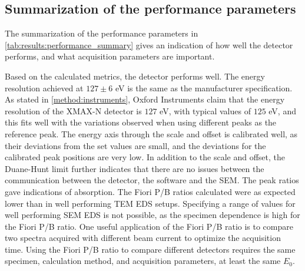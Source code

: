 \subsection{Summarization of the performance parameters}
\label{discussion:summarization_of_the_performance_parameters}


The summarization of the performance parameters in \cref{tab:results:performance_summary} gives an indication of how well the detector performs, and what acquisition parameters are important.


Based on the calculated metrics, the detector performs well.
The energy resolution achieved at $127 \pm6$ eV is the same as the manufacturer specification.
As stated in \cref{method:instruments}, Oxford Instruments claim that the energy resolution of the XMAX-N detector is $127$ eV\cite{oxford_xmax_80}, with typical values of $125$ eV, and this fits well with the variations observed when using different peaks as the reference peak.
The energy axis through the scale and offset is calibrated well, as their deviations from the set values are small, and the deviations for the calibrated peak positions are very low.
In addition to the scale and offset, the Duane-Hunt limit further indicates that there are no issues between the communication between the detector, the software and the SEM.
The peak ratios gave indications of absorption.
The Fiori P/B ratios calculated were as expected lower than in well performing TEM EDS setups.
Specifying a range of values for well performing SEM EDS is not possible, as the specimen dependence is high for the Fiori P/B ratio.
One useful application of the Fiori P/B ratio is to compare two spectra acquired with different beam current to optimize the acquisition time.
Using the Fiori P/B ratio to compare different detectors requires the same specimen, calculation method, and acquisition parameters, at least the same $E_0$.


